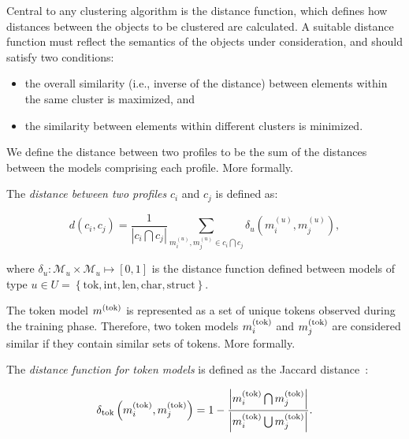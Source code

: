 Central to any clustering algorithm is the distance function, which defines how distances between the objects to be clustered are calculated.  A suitable distance function must reflect the semantics of the objects under consideration, and should satisfy two conditions:

\begin{itemize}
\item the overall similarity (i.e., inverse of the distance) between elements within the same cluster is maximized, and
\item the similarity between elements within different clusters is minimized.
\end{itemize}

We define the distance between two profiles to be the sum of the distances between the models comprising each profile. More formally.

\begin{definition}
  The \emph{distance between two profiles} $c_i$ and $c_j$ is defined as:

  \begin{equation}
    d\left(c_i,c_j\right)=\frac{1}{\left|c_i\bigcap c_j\right|}
    \sum_{m_i^{\left(u\right)},m_j^{\left(u\right)}\in c_i\bigcap c_j}
    \delta_u\left(m_i^{\left(u\right)},m_j^{\left(u\right)}\right),
    \label{eq:dist}
  \end{equation}
  
  where $\delta_u:\mathcal{M}_u\times\mathcal{M}_u\mapsto\left[0,1\right]$ is the distance function defined between models of type $u\in U=\left\{\text{tok}, \text{int}, \text{len}, \text{char}, \text{struct}\right\}$.
\end{definition}

The token model $m^{\left(\text{tok}\right)}$ is represented as a set of unique tokens observed during the training phase. Therefore, two token models $m^{\left(\text{tok}\right)}_i$ and $m^{\left(\text{tok}\right)}_j$ are considered similar if they contain similar sets of tokens.  More formally.

\begin{definition}
  The \emph{distance function for token models} is defined as the Jaccard distance~\citep{clustering:distance_metrics_survey}:

\begin{equation}
  \delta_{\text{tok}}\left(m^{\left(\text{tok}\right)}_i,m^{\left(\text{tok}\right)}_j\right)=
  1-\frac{\left|m^{\left(\text{tok}\right)}_i\bigcap m^{\left(\text{tok}\right)}_j\right|}{\left|m^{\left(\text{tok}\right)}_i\bigcup m^{\left(\text{tok}\right)}_j\right|}.
\end{equation}
\end{definition}

